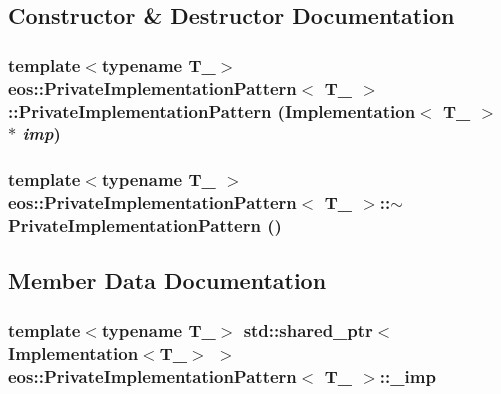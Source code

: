 \subsection{Constructor \& Destructor Documentation}
\hypertarget{classeos_1_1PrivateImplementationPattern_a3e3d5f4a565256a1dda6c234b051b2f2}{
\subsubsection[{PrivateImplementationPattern}]{\setlength{\rightskip}{0pt plus 5cm}template$<$typename T\_\-$>$ {\bf eos::PrivateImplementationPattern}$<$ T\_\- $>$::{\bf PrivateImplementationPattern} (Implementation$<$ T\_\- $>$ $\ast$ {\em imp})}}
\label{classeos_1_1PrivateImplementationPattern_a3e3d5f4a565256a1dda6c234b051b2f2}
\hypertarget{classeos_1_1PrivateImplementationPattern_acf46ec2739c3b0ec9702b9428475876d}{
\subsubsection[{$\sim$PrivateImplementationPattern}]{\setlength{\rightskip}{0pt plus 5cm}template$<$typename T\_\- $>$ {\bf eos::PrivateImplementationPattern}$<$ T\_\- $>$::$\sim${\bf PrivateImplementationPattern} ()}}
\label{classeos_1_1PrivateImplementationPattern_acf46ec2739c3b0ec9702b9428475876d}


\subsection{Member Data Documentation}
\hypertarget{classeos_1_1PrivateImplementationPattern_a232940e78b26c6ed4f97196f831c69c9}{
\subsubsection[{\_\-imp}]{\setlength{\rightskip}{0pt plus 5cm}template$<$typename T\_\-$>$ std::shared\_\-ptr$<$Implementation$<$T\_\-$>$ $>$ {\bf eos::PrivateImplementationPattern}$<$ T\_\- $>$::{\bf \_\-imp}}}
\label{classeos_1_1PrivateImplementationPattern_a232940e78b26c6ed4f97196f831c69c9}


